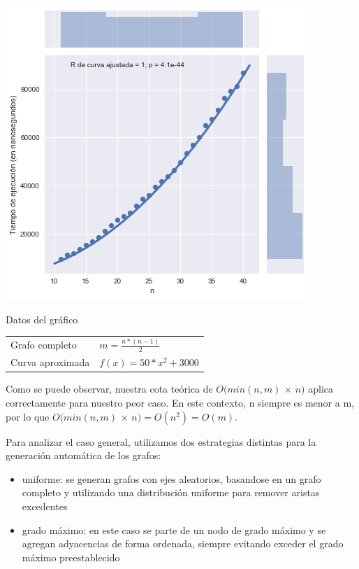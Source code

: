 \noindent
\begin{minipage}{0.55\textwidth}
    \hfill
    \includegraphics[scale=0.6]{img/greedy-complete.png}
\end{minipage}
\hfill
\begin{minipage}{0.44\textwidth}
    \begin{center}
        Datos del gráfico

        \begin{tabular}{ | l l |}
            \hline
            Grafo completo & $m = \frac{n * (n-1)}{2}$\\ 
            Curva aproximada & $f(x) = 50 * x^2 + 3000$ \\
            \hline
        \end{tabular}
    \end{center}
\end{minipage}

Como se puede observar, nuestra cota teórica de $O(min(n,m)$ $\times$ $n)$ aplica correctamente para nuestro peor caso. En este contexto, n siempre es menor a m, por lo que $O(min(n,m)$ $\times$ $n) = O(n^2) = O(m)$.

Para analizar el caso general, utilizamos dos estrategias distintas para la generación automática de los grafos:

\begin{itemize}
    \item uniforme: se generan grafos con ejes aleatorios, basandose en un grafo completo y utilizando una distribución uniforme para remover aristas excedentes

    \item grado máximo: en este caso se parte de un nodo de grado máximo y se agregan adyacencias de forma ordenada, siempre evitando exceder el grado máximo preestablecido
\end{itemize}

